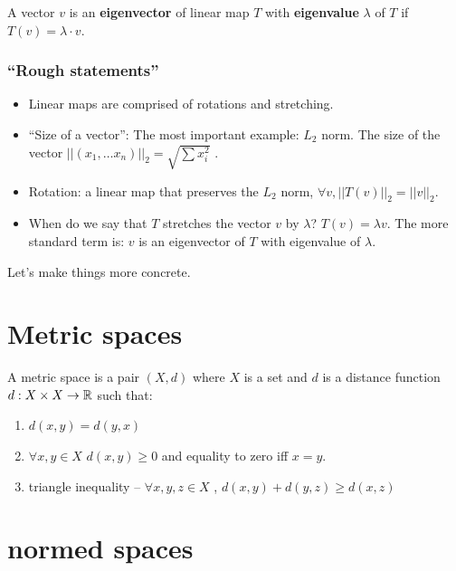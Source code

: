 \begin{definition}
A vector $v$ is an \textbf{eigenvector} of linear map $T$ with \textbf{eigenvalue}
$\lambda$ of $T$ if $T\left(v\right)=\lambda\cdot v$.
\end{definition}


\subsubsection{\textquotedblleft Rough statements\textquotedblright{} }
\begin{itemize}
\item Linear maps are comprised of rotations and stretching.
\item ``Size of a vector'': The most important example: $L_{2}$ norm.
The size of the vector $\left|\left|\left(x_{1},\dots x_{n}\right)\right|\right|_{2}=\sqrt{\sum x_{i}^{2}}$
.
\item Rotation: a linear map that preserves the $L_{2}$ norm, $\forall v,\left|\left|T\left(v\right)\right|\right|_{2}=\left|\left|v\right|\right|_{2}$.
\item When do we say that $T$ stretches the vector $v$ by $\lambda$?
$T\left(v\right)=\lambda v$. The more standard term is: $v$ is an
eigenvector of $T$ with eigenvalue of $\lambda$.
\end{itemize}
Let's make things more concrete.

\section{Metric spaces}
\begin{definition}
A metric space is a pair $\left(X,d\right)$ where $X$ is a set and
$d$ is a distance function $d:X\times X\to\mathbb{R}$ such that:
\begin{enumerate}
\item $d\left(x,y\right)=d\left(y,x\right)$
\item $\forall x,y\in X$ $d\left(x,y\right)\ge0$ and equality to zero
iff $x=y$. 
\item triangle inequality -- $\forall x,y,z\in X$ , $d\left(x,y\right)+d\left(y,z\right)\ge d\left(x,z\right)$
\end{enumerate}
\end{definition}


\section{normed spaces}

